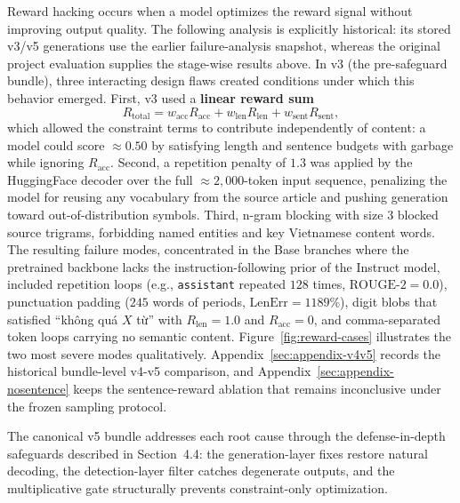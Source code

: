 \documentclass[11pt]{article}
\newcommand{\vn}[1]{{\vietfont #1}}
\begin{document}
Reward hacking occurs when a model optimizes the reward signal without improving output quality.
The following analysis is explicitly historical: its stored v3/v5 generations use the earlier failure-analysis snapshot, whereas the original project evaluation supplies the stage-wise results above.
In v3 (the pre-safeguard bundle), three interacting design flaws created conditions under which this behavior emerged.
First, v3 used a \textbf{linear reward sum}
\[
R_{\text{total}} = w_{\text{acc}}R_{\text{acc}} + w_{\text{len}}R_{\text{len}} + w_{\text{sent}}R_{\text{sent}},
\]
which allowed the constraint terms to contribute independently of content: a model could score $\approx 0.50$ by satisfying length and sentence budgets with garbage while ignoring $R_{\text{acc}}$.
Second, a repetition penalty of $1.3$ was applied by the HuggingFace decoder over the full $\approx 2{,}000$-token input sequence, penalizing the model for reusing any vocabulary from the source article and pushing generation toward out-of-distribution symbols.
Third, n-gram blocking with size $3$ blocked source trigrams, forbidding named entities and key Vietnamese content words.
The resulting failure modes, concentrated in the Base branches where the pretrained backbone lacks the instruction-following prior of the Instruct model, included repetition loops (e.g., \texttt{assistant} repeated $128$ times, $\text{ROUGE-2}=0.0$), punctuation padding ($245$ words of periods, $\text{LenErr}=1189\%$), digit blobs that satisfied ``\vn{không quá $X$ từ}'' with $R_{\text{len}}=1.0$ and $R_{\text{acc}}=0$, and comma-separated token loops carrying no semantic content.
Figure~\ref{fig:reward-cases} illustrates the two most severe modes qualitatively.
Appendix~\ref{sec:appendix-v4v5} records the historical bundle-level v4-v5 comparison, and Appendix~\ref{sec:appendix-nosentence} keeps the sentence-reward ablation that remains inconclusive under the frozen sampling protocol.

The canonical v5 bundle addresses each root cause through the defense-in-depth safeguards described in Section~4.4: the generation-layer fixes restore natural decoding, the detection-layer filter catches degenerate outputs, and the multiplicative gate structurally prevents constraint-only optimization.
\end{document}
